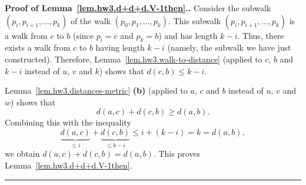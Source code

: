 \documentclass[numbers=enddot,12pt,final,onecolumn,notitlepage]{scrartcl}%
\theoremstyle{definition}
\newenvironment{proof}[1][Proof]{\noindent\textbf{#1.} }{\ \rule{0.5em}{0.5em}}
\newcommand{\tup}[1]{\left( #1 \right)}
\begin{document}
\begin{proof}[Proof of Lemma~\ref{lem.hw3.d+d+d.V-1then}.]
Consider the subwalk $\tup{p_i, p_{i+1}, \ldots, p_k}$ of the walk
$\tup{p_0, p_1, \ldots, p_k}$.
This subwalk $\tup{p_i, p_{i+1}, \ldots, p_k}$ is a walk from $c$ to
$b$ (since $p_i = c$ and $p_k = b$) and has length $k-i$.
Thus, there exists a walk from $c$ to $b$ having length $k-i$
(namely, the subwalk we have just constructed).
Therefore, Lemma~\ref{lem.hw3.walk-to-distance} (applied to $c$, $b$
and $k-i$ instead of $u$, $v$ and $k$) shows that
$d \tup{c, b} \leq k-i$.

Lemma~\ref{lem.hw3.distances-metric} \textbf{(b)} (applied to $a$, $c$
and $b$ instead of $u$, $v$ and $w$) shows that
\[
d \tup{a, c} + d \tup{c, b} \geq d \tup{a, b} .
\]
Combining this with the inequality
\[
\underbrace{d \tup{a, c}}_{\leq i}
+ \underbrace{d \tup{c, b}}_{\leq k-i}
\leq i + \tup{k-i} = k = d \tup{a, b} ,
\]
we obtain $d \tup{a, c} + d \tup{c, b} = d \tup{a, b}$.
This proves Lemma~\ref{lem.hw3.d+d+d.V-1then}.
\end{proof}
\end{document}
